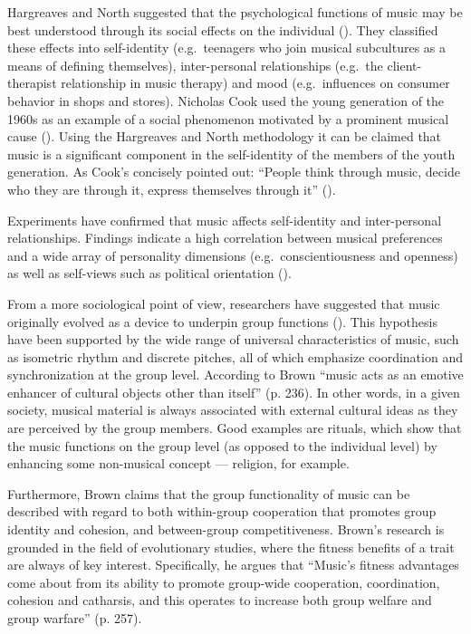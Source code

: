 \documentclass[a4paper,11pt]{article}
\begin{document}
Hargreaves and North suggested that the psychological functions of music may be best understood through its social effects on the individual (\cite*{hargreaves99}).
They classified these effects into self-identity (e.g.\ teenagers who join musical subcultures as a means of defining themselves), inter-personal relationships (e.g.\ the client-therapist relationship in music therapy) and mood (e.g.\ influences on consumer behavior in shops and stores).
Nicholas Cook used the young generation of the 1960s as an example of a social phenomenon motivated by a prominent musical cause (\cite*[p. 5]{cook00}).
Using the Hargreaves and North methodology it can be claimed that music is a significant component in the self-identity of the members of the youth generation.
As Cook's concisely pointed out: ``People think through music, decide who they are through it, express themselves through it'' (\cite*{cook00}).

Experiments have confirmed that music affects self-identity and inter-personal relationships.
Findings indicate a high correlation between musical preferences and a wide array of personality dimensions (e.g.\ conscientiousness and openness) as well as self-views such as political orientation (\cite{rentfrow03}).

From a more sociological point of view, researchers have suggested that music originally evolved as a device to underpin group functions (\cite{Brown2000}).
This hypothesis have been supported by the wide range of universal characteristics of music, such as isometric rhythm and discrete pitches, all of which emphasize coordination and synchronization at the group level.
According to Brown ``music acts as an emotive enhancer of cultural objects other than itself'' (p. 236).
In other words, in a given society, musical material is always associated with external cultural ideas as they are perceived by the group members.
Good examples are rituals, which show that the music functions on the group level (as opposed to the individual level) by enhancing some non-musical concept ---  religion, for example.

Furthermore, Brown claims that the group functionality of music can be described with regard to both within-group cooperation that promotes group identity and cohesion, and between-group competitiveness.
Brown's research is grounded in the field of evolutionary studies, where the fitness benefits of a trait are always of key interest.
Specifically, he argues that ``Music's fitness advantages come about from its ability to promote group-wide cooperation, coordination, cohesion and catharsis, and this operates to increase both group welfare and group warfare'' (p. 257).
\end{document}
